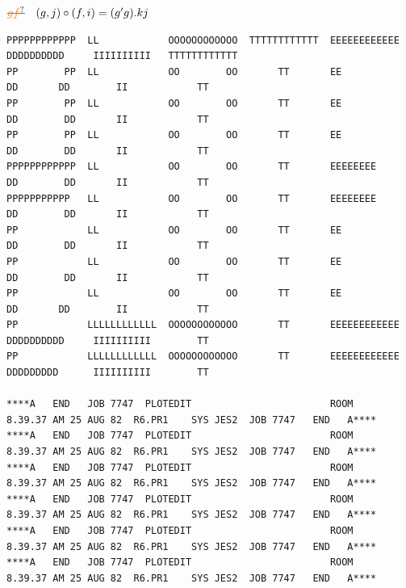 
$\deleted{\unsure{gf}}\quad (g,j)\circ(f,i)=(g'g)\mathord{.}kj$

{\fontsize{4}{5}\selectfont
\begin{verbatim}
PPPPPPPPPPPP  LL            OOOOOOOOOOOO  TTTTTTTTTTTT  EEEEEEEEEEEE  DDDDDDDDDD     IIIIIIIIII   TTTTTTTTTTTT
PP        PP  LL            OO        OO       TT       EE            DD       DD        II            TT
PP        PP  LL            OO        OO       TT       EE            DD        DD       II            TT
PP        PP  LL            OO        OO       TT       EE            DD        DD       II            TT
PPPPPPPPPPPP  LL            OO        OO       TT       EEEEEEEE      DD        DD       II            TT
PPPPPPPPPPP   LL            OO        OO       TT       EEEEEEEE      DD        DD       II            TT
PP            LL            OO        OO       TT       EE            DD        DD       II            TT
PP            LL            OO        OO       TT       EE            DD        DD       II            TT
PP            LL            OO        OO       TT       EE            DD       DD        II            TT
PP            LLLLLLLLLLLL  OOOOOOOOOOOO       TT       EEEEEEEEEEEE  DDDDDDDDDD     IIIIIIIIII        TT
PP            LLLLLLLLLLLL  OOOOOOOOOOOO       TT       EEEEEEEEEEEE  DDDDDDDDD      IIIIIIIIII        TT

****A   END   JOB 7747  PLOTEDIT                        ROOM        8.39.37 AM 25 AUG 82  R6.PR1    SYS JES2  JOB 7747   END   A****
****A   END   JOB 7747  PLOTEDIT                        ROOM        8.39.37 AM 25 AUG 82  R6.PR1    SYS JES2  JOB 7747   END   A****
****A   END   JOB 7747  PLOTEDIT                        ROOM        8.39.37 AM 25 AUG 82  R6.PR1    SYS JES2  JOB 7747   END   A****
****A   END   JOB 7747  PLOTEDIT                        ROOM        8.39.37 AM 25 AUG 82  R6.PR1    SYS JES2  JOB 7747   END   A****
****A   END   JOB 7747  PLOTEDIT                        ROOM        8.39.37 AM 25 AUG 82  R6.PR1    SYS JES2  JOB 7747   END   A****
****A   END   JOB 7747  PLOTEDIT                        ROOM        8.39.37 AM 25 AUG 82  R6.PR1    SYS JES2  JOB 7747   END   A****
\end{verbatim}
}

